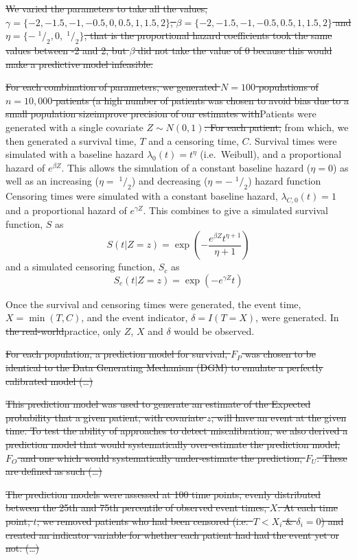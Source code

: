 \documentclass[12pt,PhD,twoside,openright]{muthesis}
\newcommand{\sfrac}[2]{\;^{#1}/_{#2}}
\begin{document}
\sout{We varied the parameters to take all the values,\(\gamma = \{-2,-1.5,-1,-0.5,0,0.5,1,1.5,2\}\), \(\beta = \{-2,-1.5,-1,-0.5,0.5,1,1.5,2\}\) and \(\eta = \{-\sfrac{1}{2},0,\sfrac{1}{2}\}\), that is the proportional hazard coefficients took the same values between -2 and 2, but \(\beta\) did not take the value of 0 because this would make a predictive model infeasible.}

\sout{For each combination of parameters, we generated \(N = 100\) populations of \(n = 10,000\) patients (a high number of patients was chosen to avoid bias due to a small population sizeimprove precision of our estimates with}Patients were generated with a single covariate \(Z \sim N(0,1)\)\sout{. For each patient,} from which, we then generated a survival time, \(T\) and a censoring time, \(C\). Survival times were simulated with a baseline hazard \(\lambda_0(t) = t^{\eta}\) (i.e.~Weibull), and a proportional hazard of \(e^{\beta Z}\). This allows the simulation of a constant baseline hazard (\(\eta = 0\)) as well as an increasing (\(\eta = \sfrac{1}{2}\)) and decreasing (\(\eta = -\sfrac{1}{2}\)) hazard function Censoring times were simulated with a constant baseline hazard, \(\lambda_{C,0}(t) = 1\) and a proportional hazard of \(e^{\gamma Z}\). This combines to give a simulated survival function, \(S\) as
\[
S(t|Z=z) = \exp\left(-\frac{e^{\beta Z}t^{\eta+1}}{\eta+1}\right)
\]
and a simulated censoring function, \(S_c\) as
\[
S_c(t|Z=z) = \exp\left(-e^{\gamma Z}t\right)
\]

Once the survival and censoring times were generated, the event time, \(X = \min(T,C)\), and the event indicator, \(\delta = I(T=X)\), were generated. In \sout{the real-world}practice, only \(Z\), \(X\) and \(\delta\) would be observed.

\sout{For each population, a prediction model for survival, \(F_P\) was chosen to be identical to the Data Generating Mechanism (DGM) to emulate a perfectly calibrated model (\ldots)}

\sout{This prediction model was used to generate an estimate of the Expected probability that a given patient, with covariate \(z\), will have an event at the given time. To test the ability of approaches to detect miscalibration, we also derived a prediction model that would systematically over-estimate the prediction model, \(F_O\) and one which would systematically under-estimate the prediction, \(F_U\). These are defined as such (\ldots)}

\sout{The prediction models were assessed at 100 time points, evenly distributed between the 25th and 75th percentile of observed event times, \(X\). At each time point, \(t\), we removed patients who had been censored (i.e.~\(T < X_i\) \& \(\delta_i = 0\)) and created an indicator variable for whether each patient had had the event yet or not: (\ldots)}
\end{document}
